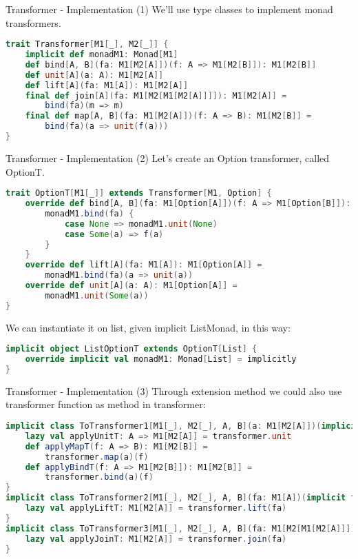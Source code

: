 \begin{frame}[fragile]{Transformer - Implementation (1)}
	We'll use type classes to implement monad transformers.
\begin{lstlisting}[language=scala]
trait Transformer[M1[_], M2[_]] {
	implicit def monadM1: Monad[M1]	
	def bind[A, B](fa: M1[M2[A]])(f: A => M1[M2[B]]): M1[M2[B]]
	def unit[A](a: A): M1[M2[A]]
	def lift[A](fa: M1[A]): M1[M2[A]]
	final def join[A](fa: M1[M2[M1[M2[A]]]]): M1[M2[A]] =
		bind(fa)(m => m)
	final def map[A, B](fa: M1[M2[A]])(f: A => B): M1[M2[B]] =
		bind(fa)(a => unit(f(a)))
}
\end{lstlisting}
\end{frame}

\begin{frame}[fragile]{Transformer - Implementation (2)}	
	Let's create an Option transformer, called OptionT.
\begin{lstlisting}[language=scala]
trait OptionT[M1[_]] extends Transformer[M1, Option] {
	override def bind[A, B](fa: M1[Option[A]])(f: A => M1[Option[B]]): M1[Option[B]] = {
		monadM1.bind(fa) {
			case None => monadM1.unit(None)
			case Some(a) => f(a)
		}
	}
	override def lift[A](fa: M1[A]): M1[Option[A]] =
		monadM1.bind(fa)(a => unit(a))
	override def unit[A](a: A): M1[Option[A]] = 
		monadM1.unit(Some(a))
}		
\end{lstlisting}		
	We can instantiate it on list, given  implicit ListMonad, in  this way:
\begin{lstlisting}[language=scala]
implicit object ListOptionT extends OptionT[List] {
	override implicit val monadM1: Monad[List] = implicitly
}
\end{lstlisting}
\end{frame}

\begin{frame}[fragile]{Transformer - Implementation (3)}	
	Through extension method we could also use transformer function as method in transformer:
\begin{lstlisting}[language=scala]
implicit class ToTransformer1[M1[_], M2[_], A, B](a: M1[M2[A]])(implicit transformer: Transformer[M1, M2]) {
	lazy val applyUnitT: A => M1[M2[A]] = transformer.unit
	def applyMapT(f: A => B): M1[M2[B]] = 
		transformer.map(a)(f)	
	def applyBindT(f: A => M1[M2[B]]): M1[M2[B]] = 
		transformer.bind(a)(f)
}
implicit class ToTransformer2[M1[_], M2[_], A, B](fa: M1[A])(implicit transformer: Transformer[M1, M2]) {
	lazy val applyLiftT: M1[M2[A]] = transformer.lift(fa)
}
implicit class ToTransformer3[M1[_], M2[_], A, B](fa: M1[M2[M1[M2[A]]]])(implicit transformer: Transformer[M1, M2]) {
	lazy val applyJoinT: M1[M2[A]] = transformer.join(fa)
}
\end{lstlisting}	
\end{frame}

